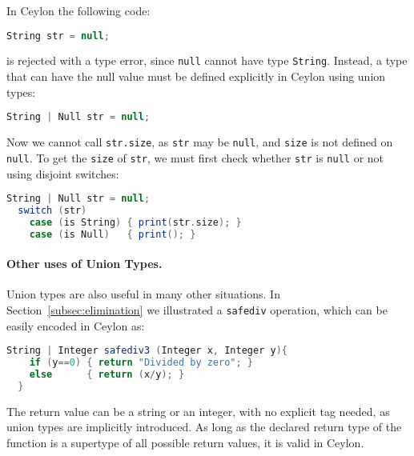 In Ceylon the following code:

\begin{lstlisting}[language=Scala]
  String str = null;
\end{lstlisting}

\noindent is rejected with a type error, since \lstinline{null} cannot have type \lstinline{String}.
Instead, a type that can have the null value must be defined explicitly
in Ceylon using union types:

\begin{lstlisting}[language=Scala]
  String | Null str = null;
\end{lstlisting}

\noindent Now we cannot call \lstinline{str.size},
as \lstinline{str} may be \lstinline{null}, and \lstinline{size} is not defined
on \lstinline{null}.
To get the \lstinline{size} of \lstinline{str}, we must first check whether \lstinline{str} is \lstinline{null}
or not using disjoint switches:

\begin{lstlisting}[language=Scala]
  String | Null str = null;
  switch (str)
    case (is String) { print(str.size); }
    case (is Null)   { print(); }
\end{lstlisting}

\paragraph*{Other uses of Union Types.}
Union types are also useful in many other situations.
In Section~\ref{subsec:elimination} we illustrated a \lstinline{safediv} operation, which
can be easily encoded in Ceylon as:
%
\begin{lstlisting}[language=Scala]
  String | Integer safediv3 (Integer x, Integer y){
    if (y==0) { return "Divided by zero"; }
    else      { return (x/y); }
  }
\end{lstlisting}
%
The return value can be a string or an integer,
with no explicit tag needed,
as union types are implicitly introduced.
As long as the declared return type of the function
is a supertype of all possible return values, it is valid
in Ceylon.






